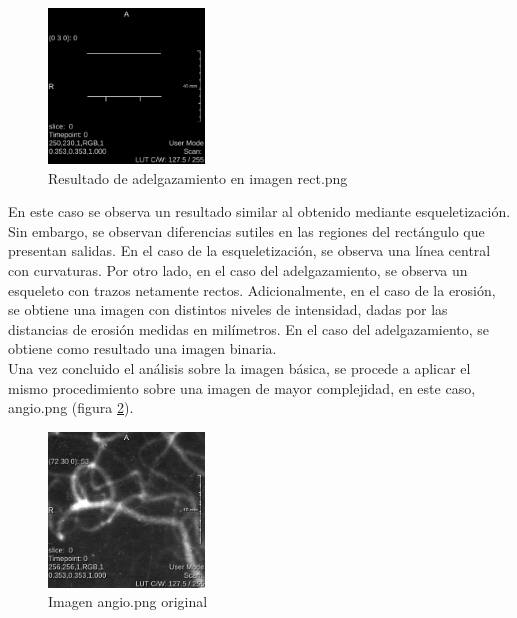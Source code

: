 \documentclass{article}
\begin{document}
\begin{figure}[ht]
\begin{center}
\includegraphics[width=0.37\textwidth]{3Esqueleto/3_thin1} %
\caption{Resultado de adelgazamiento en imagen rect.png}
\label{fg:thin1}
\end{center}
\end{figure}
\FloatBarrier

En este caso se observa un resultado similar al obtenido mediante esqueletizaci\'{o}n. Sin embargo, se observan diferencias sutiles en las regiones del rect\'{a}ngulo que presentan salidas. En el caso de la esqueletizaci\'{o}n, se observa una l\'{i}nea central con curvaturas. Por otro lado, en el caso del adelgazamiento, se observa un esqueleto con trazos netamente rectos. Adicionalmente, en el caso de la erosi\'{o}n, se obtiene una imagen con distintos niveles de intensidad, dadas por las distancias de erosi\'{o}n medidas en mil\'{i}metros. En el caso del adelgazamiento, se obtiene como resultado una imagen binaria. \\
Una vez concluido el an\'{a}lisis sobre la imagen b\'{a}sica, se procede a aplicar el mismo procedimiento sobre una imagen de mayor complejidad, en este caso, angio.png (figura \ref{fg:3_original2}).

\begin{figure}[ht]
\begin{center}
\includegraphics[width=0.37\textwidth]{3Esqueleto/3_original2} %
\caption{Imagen angio.png original}
\label{fg:3_original2}
\end{center}
\end{figure}
\FloatBarrier
\end{document}

